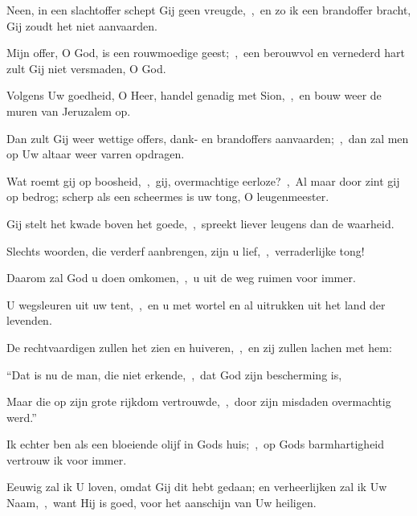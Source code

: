 \documentclass[12pt,twoside,a5paper]{article}
\begin{document}
\begin{halfparskip}
  Neen, in een slachtoffer schept Gij geen vreugde,~\sep\ en zo ik een brandoffer bracht, Gij zoudt het niet aanvaarden.

  Mijn offer, O God, is een rouwmoedige geest;~\sep\ een berouwvol en vernederd hart zult Gij niet versmaden, O God.

  Volgens Uw goedheid, O Heer, handel genadig met Sion,~\sep\ en bouw weer de muren van Jeruzalem op.

  Dan zult Gij weer wettige offers, dank- en brandoffers aanvaarden;~\sep\ dan zal men op Uw altaar weer varren opdragen.

   Wat roemt gij op boosheid,~\sep\ gij, overmachtige eerloze?~\sep\ Al maar door zint gij op bedrog; scherp als een scheermes is uw tong, O leugenmeester.

  Gij stelt het kwade boven het goede,~\sep\ spreekt liever leugens dan de waarheid.

  Slechts woorden, die verderf aanbrengen, zijn u lief,~\sep\ verraderlijke tong!

  Daarom zal God u doen omkomen,~\sep\ u uit de weg ruimen voor immer.

  U wegsleuren uit uw tent,~\sep\ en u met wortel en al uitrukken uit het land der levenden.

  De rechtvaardigen zullen het zien en huiveren,~\sep\ en zij zullen lachen met hem:

  ``Dat is nu de man, die niet erkende,~\sep\ dat God zijn bescherming is,

  Maar die op zijn grote rijkdom vertrouwde,~\sep\ door zijn misdaden overmachtig werd.''

  Ik echter ben als een bloeiende olijf in Gods huis;~\sep\ op Gods barmhartigheid vertrouw ik voor immer.

  Eeuwig zal ik U loven, omdat Gij dit hebt gedaan; en verheerlijken zal ik Uw Naam,~\sep\ want Hij is goed, voor het aanschijn van Uw heiligen.
\end{halfparskip}
\end{document}
